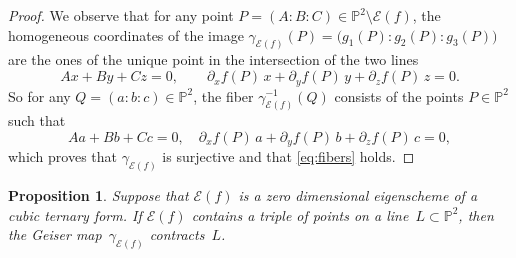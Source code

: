 \documentclass{amsart}
\theoremstyle{plain}
\newtheorem{prop}[lemma]{Proposition}
\theoremstyle{definition}
\newcommand{\p}{\mathbb{P}}
\newcommand{\Bl}{\mathrm{Bl}}
\newcommand{\Eig}[1]{\mathcal{E}\!\left( {#1} \right)}
\begin{document}
\begin{proof}
We observe that for any point $P=(A:B:C) \in \p^2 \setminus \Eig{f}$, the homogeneous coordinates
of the image $\gamma_{\Eig{f}}(P) = \bigl( g_1(P): g_2(P): g_3(P) \bigr)$ are the ones of the unique point in the intersection of the two lines
%
\[
  Ax + By+ Cz = 0, \qquad
  \partial_x f(P) \, x + \partial_y f(P) \, y+ \partial_z f(P) \, z = 0.
\]
%
So for any $Q = (a:b:c) \in \p^2$, the fiber $\gamma_{\Eig{f}}^{-1}(Q)$ consists of the points $P \in \p^2$ such that
%
\begin{equation}
\label{eq:polars}
Aa + Bb+ Cc = 0, \quad
\partial_x f(P) \, a + \partial_y f(P) \, b + \partial_z f(P) \, c = 0,
\end{equation}
%
which proves that $\gamma_{\Eig{f}}$ is surjective and that \eqref{eq:fibers} holds.
\end{proof}

\begin{prop}
\label{prop:allineati_contrae}
Suppose that $\Eig{f}$ is a zero dimensional eigenscheme of a cubic ternary form.
If $\Eig{f}$ contains a triple of points on a line~$L \subset \p^2$, then the Geiser map~$\gamma_{\Eig{f}}$ contracts~$L$.
\end{prop}
\end{document}
